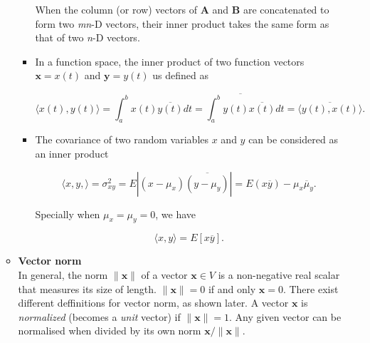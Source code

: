\documentclass[10pt,b5paper,titlepage]{book}
\begin{document}
\begin{itemize}
\begin{itemize}
\begin{itemize}
                         When the column (or row) vectors of $\mathbf{A}$
                         and $\mathbf{B}$ are concatenated to form two
                         \textit{mn}-D vectors, their inner product takes the
                         same form as that of two \textit{n}-D vectors.

                     \item In a function space, the inner product of two function vectors
                         $\mathbf{x} = x(t)$ and $\mathbf{y} = y(t)$ us defined as

                         \begin{equation}
                             \langle x(t), y(t) \rangle
                             = \int_{a}^{b} x(t) \overline{y(t)} dt
                             = \overline{\int_{a}^{b} y(t) \overline{x(t)}}dt
                             = \overline{\langle y(t), x(t) \rangle}
                         .\end{equation}

                     \item The covariance of two random variables $x$ and $y$ can
                         be considered as an inner product

                         \begin{equation}
                             \langle x, y, \rangle = \sigma_{xy}^{2}
                             = E \left| (x - \mu_{x}) \overline{(y - \mu_{y})} \right|
                             = E(x \overline{y}) - \mu_{x} \overline{\mu}_{y}
                         .\end{equation}

                         Specially when $\mu_x = \mu_y = 0$, we have

                         \begin{equation}
                             \langle x, y \rangle = E [x \overline{y}]
                         .\end{equation}
                 \end{itemize}

             \item \textbf{Vector norm}\\

                 In general, the norm $\|\mathbf{x}\|$ of a vector $\mathbf{x} \in V$
                 is a non-negative real scalar that measures its size of length.
                 $\|\mathbf{x}\| = 0$ if and only $\mathbf{x} = 0$. There exist
                 different deffinitions for vector norm, as shown later. A vector
                 $\mathbf{x}$ is \textit{normalized} (becomes a \textit{unit} vector)
                 if $\|\mathbf{x}\| = 1$. Any given vector can be normalised when
                 divided by its own norm $\mathbf{x} / \|\mathbf{x}\|$.


\end{itemize}
\end{itemize}
\end{document}
